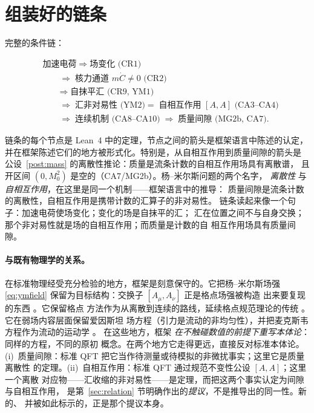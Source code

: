 \documentclass[aps,prd,preprint,superscriptaddress,amsmath,amssymb]{revtex4-2}
\begin{document}
\section{组装好的链条}
\label{sec:chain}

完整的条件链：

\begin{equation}
\begin{aligned}
&\text{加速电荷} \;\Rightarrow\; \text{场变化 (CR1)}\\
&\qquad \Rightarrow\; \text{核力通道 } m\dot C\neq0 \text{ (CR2)}\\
&\qquad \Rightarrow\; \text{自抹平汇 (CR9, YM1)}\\
&\qquad \Rightarrow\; \text{汇非对易性 (YM2)}
  =\; \text{自相互作用 } [A,A] \text{ (CA3--CA4)}\\
&\qquad \Rightarrow\; \text{连续机制 (CA8--CA10)}
  \;\Rightarrow\; \text{质量间隙 (MG2b, CA7)} .
\end{aligned}
\end{equation}

链条的每个节点是 Lean~4 中的定理，节点之间的箭头是框架语言中陈述的认定，
并在框架陈述它们的地方被形式化。特别是，从自相互作用到质量间隙的箭头是
公设~\ref{post:mass} 的离散性推论：质量是流条计数的自相互作用场具有离散谱，
且开区间 $(0,M_0^2)$ 是空的（CA7/MG2b）。杨--米尔斯问题的两个名字，
\emph{离散性} 与 \emph{自相互作用}，在这里是同一个机制——框架语言中的推导：
质量间隙是流条计数的离散性，自相互作用是携带计数的汇算子的非对易性。
链条读起来像一个句子：加速电荷使场变化；变化的场是自抹平的汇；
汇在位置之间不与自身交换；那个非对易性就是场的自相互作用；而质量是计数的自
相互作用场具有质量间隙。

\paragraph{与既有物理学的关系。}
在标准物理经受充分检验的地方，框架是刻意保守的。它把杨--米尔斯场强
\eqref{eq:ymfield} 保留为目标结构：交换子 $[A_\mu,A_\nu]$ 正是格点场强被构造
出来要复现的东西 \cite{yang1954conservation,peskin1995introduction}。它保留格点
方法作为从离散到连续的路线，延续格点规范理论的传统
\cite{morningstar1999glueball,chen2006glueball}。它在弱场内容层面保留爱因斯坦
场方程（引力是流动的非均匀性），并把麦克斯韦方程作为流动的运动学
\cite{einstein1915feldgleichungen,gordon1923lichtfortpflanzung,maxwell1996dynamical}。
在这些地方，框架 \emph{在不触碰数值的前提下重写本体论}：同样的方程，不同的原初
概念。在两个地方它走得更远，直接反对标准本体论。
(i)~质量间隙：标准 QFT 把它当作待测量或待模拟的非微扰事实；这里它是质量离散性
的定理。(ii)~自相互作用：标准 QFT 通过规范不变性公设 $[A,A]$；这里一个离散
对应物——汇收缩的非对易性——是定理，而把这两个事实认定为间隙与自相互作用，
是第~\ref{sec:relation} 节明确作出的\emph{提议}，不是推导出的同一性。新的、
并被如此标示的，正是那个提议本身。
\end{document}
